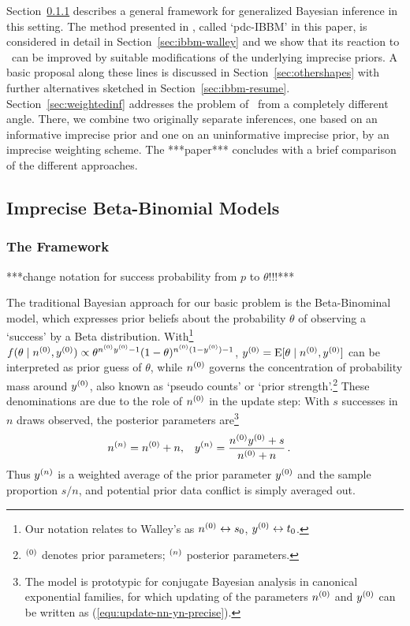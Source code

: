 \medskip

Section~\ref{sec:ibbm-framework} describes a general framework for
generalized Bayesian inference in this setting. The method presented in \textcite[\S 5.4.3]{1991:walley},
called `pdc-IBBM' in this paper, is considered in detail in Section~\ref{sec:ibbm-walley}
and we show that its reaction to \pdc\ can be improved
by suitable modifications of the underlying imprecise
priors. A basic proposal along these lines is discussed in
Section~\ref{sec:othershapes} with further alternatives
sketched in Section~\ref{sec:ibbm-resume}.
Section~\ref{sec:weightedinf} addresses the problem of \pdc\ from a
completely different angle. There, we combine two originally separate
inferences, one based on an informative imprecise prior and one
on an uninformative imprecise prior, by an imprecise weighting
scheme. The ***paper*** concludes with a brief comparison of the different
approaches.


\subsection{Imprecise Beta-Binomial Models}
\label{sec:ibbm}

\subsubsection{The Framework}
\label{sec:ibbm-framework}

***change notation for success probability from $p$ to $\theta$!!!***

The traditional Bayesian approach for our basic problem is the Beta-Binominal model, which expresses prior
beliefs about the probability $\theta$ of observing a `success' by a Beta
distribution. With\footnote{Our notation relates to
Walley's \parencite*{1991:walley} as $n^{(0)} \leftrightarrow s_0$, $y^{(0)} \leftrightarrow t_0$.}
$f(\theta\mid n^{(0)}, y^{(0)}) \propto \theta^{n^{(0)}y^{(0)} -1} (1-\theta)^{n^{(0)}(1-y^{(0)})-1}$,
$y^{(0)} = \operatorname{E}[\theta\mid n^{(0)},y^{(0)}]$ can be interpreted as prior guess of
$\theta$, while $n^{(0)}$ governs the concentration of
probability mass around $y^{(0)}$, also known as `pseudo counts' or
`prior strength'.\footnote{${}^{(0)}$ denotes prior parameters; ${}^{(n)}$ posterior parameters.}
These denominations are due to the
role of $n^{(0)}$ in the update step: With $s$ successes in $n$ draws observed, the
posterior parameters are\footnote{The model is prototypic for conjugate Bayesian
analysis in canonical exponential families, for which updating
of the parameters $n^{(0)}$ and $y^{(0)}$ can be
written as (\ref{equ:update-nn-yn-precise}).}%
\begin{align}\label{equ:update-nn-yn-precise}
n^{(n)} &= n^{(0)} + n, & y^{(n)} &= \frac{n^{(0)}y^{(0)} + s}{n^{(0)} + n}\,.
\end{align}
Thus $y^{(n)}$ is a weighted average of the prior parameter $y^{(0)}$ and
the sample proportion $s/n$, and potential prior data conflict is simply averaged out.

